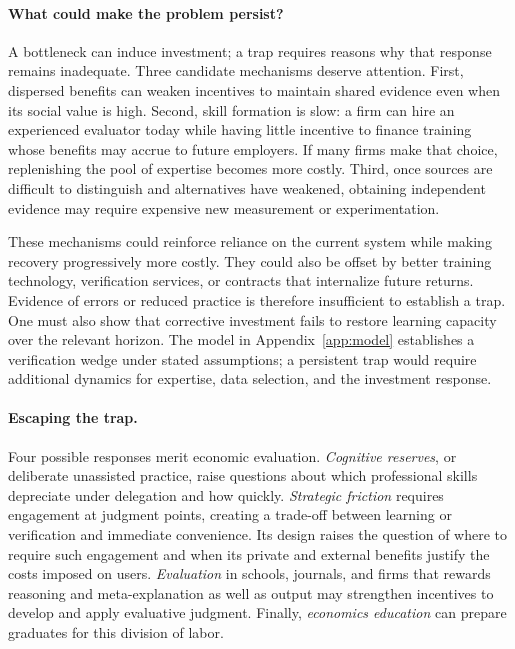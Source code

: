\documentclass[12pt]{article}
\theoremstyle{plain}
\theoremstyle{definition}
\theoremstyle{remark}
\begin{document}
\paragraph{What could make the problem persist?}
A bottleneck can induce investment; a trap requires reasons why that
response remains inadequate. Three candidate mechanisms deserve
attention. First, dispersed benefits can weaken incentives to maintain
shared evidence even when its social value is high. Second, skill
formation is slow: a firm can hire an experienced evaluator today while
having little incentive to finance training whose benefits may accrue
to future employers. If many firms make that choice, replenishing the
pool of expertise becomes more costly. Third, once sources are difficult
to distinguish and alternatives have weakened, obtaining independent
evidence may require expensive new measurement or experimentation.

These mechanisms could reinforce reliance on the current system while
making recovery progressively more costly. They could also be offset
by better training technology, verification services, or contracts that
internalize future returns. Evidence of errors or reduced practice is
therefore insufficient to establish a trap. One must also show that
corrective investment fails to restore learning capacity over the
relevant horizon. The model in Appendix~\ref{app:model} establishes a
verification wedge under stated assumptions; a persistent trap would
require additional dynamics for expertise, data selection, and the
investment response.

\paragraph{Escaping the trap.}
Four possible responses merit economic evaluation. \emph{Cognitive
reserves}, or deliberate unassisted practice, raise questions about
which professional skills depreciate under delegation and how quickly.
\emph{Strategic friction} requires engagement at judgment points,
creating a trade-off between learning or verification and immediate
convenience. Its design raises the question of where to require such
engagement and when its private and external benefits justify the
costs imposed on users. \emph{Evaluation} in schools, journals, and
firms that rewards reasoning and meta-explanation as well as output
may strengthen incentives to develop and apply evaluative judgment. Finally,
\emph{economics education} can prepare graduates for this division of
labor.
\end{document}
